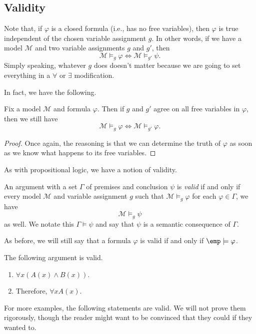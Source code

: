 \subsection{Validity}
Note that, if $\varphi$ is a closed formula (i.e., has no free variables), then $\varphi$ is true independent of the chosen variable assignment $g$. In other words, if we have a model $\mathcal M$ and two variable assignments $g$ and $g'$, then
\[\mathcal M\models_g\varphi\iff\mathcal M\models_{g'}\psi.\]
Simply speaking, whatever $g$ does doesn't matter because we are going to set everything in a $\forall$ or $\exists$ modification.

In fact, we have the following.
\begin{proposition}
	Fix a model $\mathcal M$ and formula $\varphi$. Then if $g$ and $g'$ agree on all free variables in $\varphi$, then we still have
	\[\mathcal M\models_g\varphi\iff\mathcal M\models_{g'}\varphi.\]
\end{proposition}
\begin{proof}
	Once again, the reasoning is that we can determine the truth of $\varphi$ as soon as we know what happens to its free variables.
\end{proof}
As with propositional logic, we have a notion of validity.
\begin{definition}[Valid]
	An argument with a set $\Gamma$ of premises and conclusion $\psi$ is \textit{valid} if and only if every model $\mathcal M$ and variable assignment $g$ such that $\mathcal M\models_g\varphi$ for each $\varphi\in\Gamma$, we have
	\[\mathcal M\models_g\psi\]
	as well. We notate this $\Gamma\models\psi$ and say that $\psi$ is a semantic consequence of $\Gamma$.
\end{definition}
As before, we will still say that a formula $\varphi$ is valid if and only if $\emp\models\varphi$.
\begin{example}
	The following argument is valid.
	\begin{enumerate}
		\item $\forall x(A(x)\land B(x))$.
		\item Therefore, $\forall xA(x)$.
	\end{enumerate}
\end{example}
For more examples, the following statements are valid. We will not prove them rigorously, though the reader might want to be convinced that they could if they wanted to.
